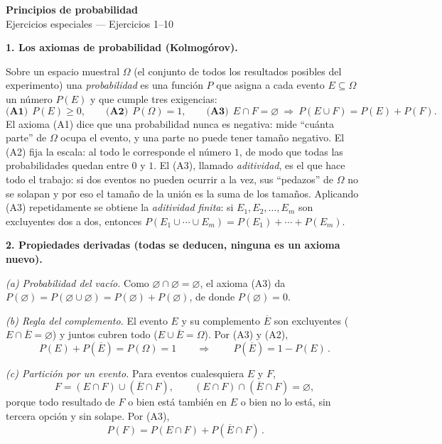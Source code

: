 \documentclass[11pt]{article}
\begin{document}
\begin{center}{\LARGE\bfseries Principios de probabilidad}\\[2pt]{\large Ejercicios especiales --- Ejercicios 1--10}\end{center}

\vspace{4pt}

\begin{teo}
\textbf{1. Los axiomas de probabilidad (Kolmogórov).}

Sobre un espacio muestral $\Omega$ (el conjunto de todos los resultados posibles del
experimento) una \emph{probabilidad} es una función $P$ que asigna a cada evento
$E\subseteq\Omega$ un número $P(E)$ y que cumple tres exigencias:
\[
\textbf{(A1)}\ \ P(E)\ge 0,\qquad
\textbf{(A2)}\ \ P(\Omega)=1,\qquad
\textbf{(A3)}\ \ E\cap F=\varnothing\ \Longrightarrow\ P(E\cup F)=P(E)+P(F).
\]
El axioma (A1) dice que una probabilidad nunca es negativa: mide ``cuánta parte'' de $\Omega$
ocupa el evento, y una parte no puede tener tamaño negativo. El (A2) fija la escala: al todo
le corresponde el número $1$, de modo que todas las probabilidades quedan entre $0$ y $1$. El
(A3), llamado \emph{aditividad}, es el que hace todo el trabajo: si dos eventos no pueden
ocurrir a la vez, sus ``pedazos'' de $\Omega$ no se solapan y por eso el tamaño de la unión es
la suma de los tamaños. Aplicando (A3) repetidamente se obtiene la \emph{aditividad finita}:
si $E_1,E_2,\dots,E_m$ son excluyentes dos a dos, entonces
$P(E_1\cup\cdots\cup E_m)=P(E_1)+\cdots+P(E_m)$.

\medskip
\textbf{2. Propiedades derivadas (todas se deducen, ninguna es un axioma nuevo).}

\emph{(a) Probabilidad del vacío.} Como $\varnothing\cap\varnothing=\varnothing$, el axioma
(A3) da $P(\varnothing)=P(\varnothing\cup\varnothing)=P(\varnothing)+P(\varnothing)$, de donde
$P(\varnothing)=0$.

\emph{(b) Regla del complemento.} El evento $E$ y su complemento $\overline{E}$ son
excluyentes ($E\cap\overline{E}=\varnothing$) y juntos cubren todo
($E\cup\overline{E}=\Omega$). Por (A3) y (A2),
\[
P(E)+P(\overline{E})=P(\Omega)=1
\qquad\Longrightarrow\qquad
\boxed{\,P(\overline{E})=1-P(E)\,}.
\]

\emph{(c) Partición por un evento.} Para eventos cualesquiera $E$ y $F$,
\[
F=(E\cap F)\cup(\overline{E}\cap F),\qquad (E\cap F)\cap(\overline{E}\cap F)=\varnothing,
\]
porque todo resultado de $F$ o bien está también en $E$ o bien no lo está, sin tercera opción
y sin solape. Por (A3),
\[
\boxed{\,P(F)=P(E\cap F)+P(\overline{E}\cap F)\,}.
\]


\end{teo}
\end{document}
